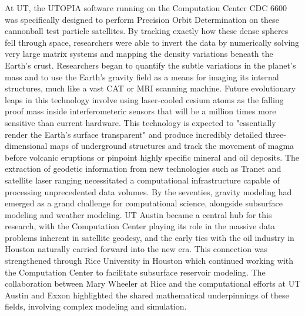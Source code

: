 At UT, the UTOPIA software running on the Computation Center CDC 6600 was specifically designed to perform Precision Orbit Determination on these cannonball test particle satellites. By tracking exactly how these dense spheres fell through space, researchers were able to invert the data by numerically solving very large matrix systems and mapping the density variations beneath the Earth's crust. Researchers began to quantify the subtle variations in the planet's mass and to use the Earth's gravity field as a means for imaging its internal structures, much like a vast CAT or MRI scanning machine. Future evolutionary leaps in this technology involve using laser-cooled cesium atoms as the falling proof mass inside interferometeric sensors that will be a million times more sensitive than current hardware. This technology is expected to "essentially render the Earth's surface transparent" and produce incredibly detailed three-dimensional maps of underground structures and track the movement of magma before volcanic eruptions or pinpoint highly specific mineral and oil deposits.
The extraction of geodetic information from new technologies such as Tranet and satellite laser ranging necessitated a computational infrastructure capable of processing unprecedented data volumes. By the seventies, gravity modeling had emerged as a grand challenge for computational science, alongside subsurface modeling and weather modeling. UT Austin became a central hub for this research, with the Computation Center playing its role in the massive data problems inherent in satellite geodesy, and the early ties with the oil industry in Houston naturally carried forward into the new era. This connection was strengthened through Rice University in Houston which continued working with the Computation Center to facilitate subsurface reservoir modeling. The collaboration between Mary Wheeler at Rice and the computational efforts at UT Austin and Exxon highlighted the shared mathematical underpinnings of these fields, involving complex modeling and simulation.
